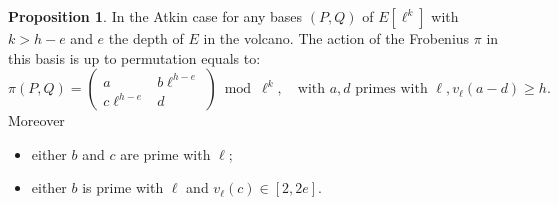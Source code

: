 \documentclass[10pt,a4paper]{beamer}
\theoremstyle{plain}
\theoremstyle{definition}
\theoremstyle{definition}
\theoremstyle{definition}
\newtheorem{prop}[thm]{Proposition}
\theoremstyle{definition}
\theoremstyle{remark}
\theoremstyle{remark}
\begin{document}


\begin{frame}
\begin{prop}
In the Atkin case for any bases $(P,Q)$ of $E[\ell^k]$ with $k>h-e$ and $e$ the depth of $E$ in the volcano. The action of the Frobenius $\pi$ in this basis is up to permutation equals to:
 \[\pi(P,Q)= \left ( \begin{matrix}a & b\ell^{h-e} \\ c\ell^{h-e} & d
\end{matrix}\right ) \bmod \ell^k, \quad \text{with }a,d \text{ primes with }\ell, v_{\ell}(a-d)\geqslant h .\]
Moreover 
\begin{itemize}
\item either $b$ and $c$ are prime with $\ell$;
\item either $b$ is prime with $\ell$ and $v_{\ell}(c) \in [2,2e]$.
\end{itemize}
\end{prop}


\end{frame}
\end{document}

